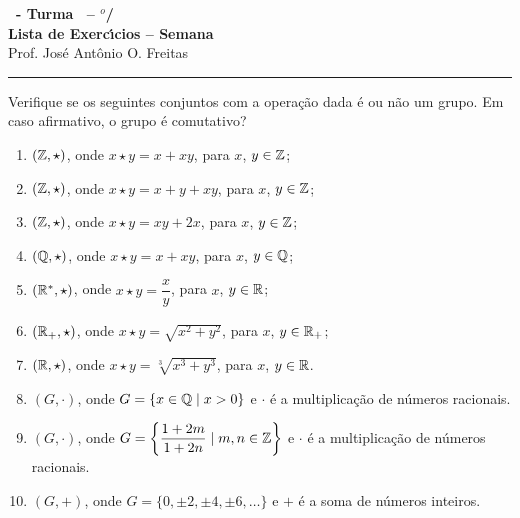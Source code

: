 \documentclass[12pt]{exam}
\begin{document}
\begin{center}

    {\Large\bf \disciplina\ - Turma \turma\ -- \semestre$^{o}$/\ano} \\ \vspace{9pt} {\large\bf
        Lista de Exerc{\'\i}cios -- Semana \numerosemana}\\ \vspace{9pt} Prof. Jos{\'e} Ant{\^o}nio O. Freitas
    \end{center}
    \hrule

    \vspace{.6cm}

    \questao{} Verifique se os seguintes conjuntos com a opera\c{c}\~ao dada \'e ou n\~ao um grupo. Em caso afirmativo, o grupo \'e comutativo?
    \begin{enumerate}[label=({\alph*})]
        \item $(\mathbb{Z}, \star)$, onde $x \star y = x + xy$, para $x$, $y \in \mathbb{Z}$;

        \item $(\mathbb{Z}, \star)$, onde $x \star y = x + y + xy$, para $x$, $y \in \mathbb{Z}$;

        \item $(\mathbb{Z}, \star)$, onde $x \star y = xy + 2x$, para $x$, $y \in \mathbb{Z}$;

        \item $(\mathbb{Q}, \star)$, onde $x \star y = x + xy$, para $x$, $y \in \mathbb{Q}$;

        \item $(\mathbb{R}^*, \star)$, onde $x \star y = \dfrac{x}{y}$, para $x$, $y \in \mathbb{R}$;

        \item $(\mathbb{R}_+, \star)$, onde $x \star y = \sqrt{x^2 + y^2}$, para $x$, $y \in \mathbb{R}_+$;

        \item $(\mathbb{R}, \star)$, onde $x \star y = \sqrt[3]{x^3 + y^3}$, para $x$, $y \in \mathbb{R}$.

        \item $(G, \cdot)$, onde $G = \{x \in \mathbb{Q} \mid x > 0\}$ e $\cdot$ \'e a multiplica\c{c}\~ao de n\'umeros racionais.

        \item $(G, \cdot)$, onde $G = \left\{\dfrac{1 + 2m}{1 + 2n} \mid m, n \in \mathbb{Z}\right\}$ e $\cdot$ \'e a multiplica\c{c}\~ao de n\'umeros racionais.

        \item $(G, +)$, onde $G = \{0, \pm 2, \pm 4, \pm 6, \dots\}$ e $+$ \'e a soma de n\'umeros inteiros.


\end{enumerate}
\end{document}
